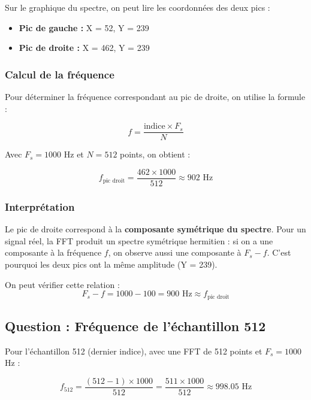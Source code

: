 \documentclass[12pt,a4paper]{article}
\begin{document}
Sur le graphique du spectre, on peut lire les coordonnées des deux pics :

\begin{itemize}
    \item \textbf{Pic de gauche :} X = 52, Y = 239
    \item \textbf{Pic de droite :} X = 462, Y = 239
\end{itemize}

\subsubsection{Calcul de la fréquence}

Pour déterminer la fréquence correspondant au pic de droite, on utilise la formule :

\begin{equation}
    f = \frac{\text{indice} \times F_s}{N}
\end{equation}

Avec $F_s = 1000$ Hz et $N = 512$ points, on obtient :

\begin{equation}
    f_{\text{pic droit}} = \frac{462 \times 1000}{512} \approx 902 \text{ Hz}
\end{equation}

\subsubsection{Interprétation}

Le pic de droite correspond à la \textbf{composante symétrique du spectre}. Pour un signal réel, la FFT produit un spectre symétrique hermitien : si on a une composante à la fréquence $f$, on observe aussi une composante à $F_s - f$. C'est pourquoi les deux pics ont la même amplitude (Y = 239).

On peut vérifier cette relation :
\begin{equation}
    F_s - f = 1000 - 100 = 900 \text{ Hz} \approx f_{\text{pic droit}}
\end{equation}

\subsection{Question : Fréquence de l'échantillon 512}

Pour l'échantillon 512 (dernier indice), avec une FFT de 512 points et $F_s = 1000$ Hz :

\begin{equation}
    f_{512} = \frac{(512 - 1) \times 1000}{512} = \frac{511 \times 1000}{512} \approx 998.05 \text{ Hz}
\end{equation}
\end{document}
